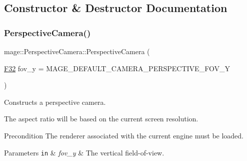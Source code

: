 \subsection{Constructor \& Destructor Documentation}
\hypertarget{classmage_1_1_perspective_camera_afa6acb116037cf4255355a791b260f04}{}\label{classmage_1_1_perspective_camera_afa6acb116037cf4255355a791b260f04} 
\subsubsection{\texorpdfstring{Perspective\+Camera()}{PerspectiveCamera()}\hspace{0.1cm}{\footnotesize\ttfamily [1/6]}}
{\footnotesize\ttfamily mage\+::\+Perspective\+Camera\+::\+Perspective\+Camera (\begin{DoxyParamCaption}\item[{\hyperlink{namespacemage_aa97e833b45f06d60a0a9c4fc22ae02c0}{F32}}]{fov\+\_\+y = {\ttfamily MAGE\+\_\+DEFAULT\+\_\+CAMERA\+\_\+PERSPECTIVE\+\_\+FOV\+\_\+Y} }\end{DoxyParamCaption})\hspace{0.3cm}{\ttfamily [explicit]}}

Constructs a perspective camera.

The aspect ratio will be based on the current screen resolution.

\begin{DoxyPrecond}{Precondition}
The renderer associated with the current engine must be loaded. 
\end{DoxyPrecond}

\begin{DoxyParams}[1]{Parameters}
\mbox{\tt in}  & {\em fov\+\_\+y} & The vertical field-\/of-\/view. \\
\hline
\end{DoxyParams}
\hypertarget{classmage_1_1_perspective_camera_aefeddb5c1199f9048793db889a647028}{}\label{classmage_1_1_perspective_camera_aefeddb5c1199f9048793db889a647028} 
